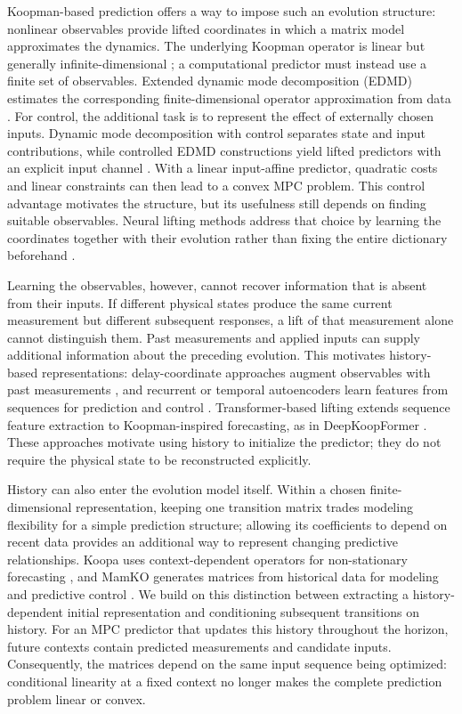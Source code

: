 \documentclass[journal]{IEEEtran}
\begin{document}
Koopman-based prediction offers a way to impose such an evolution structure: nonlinear observables provide lifted coordinates in which a matrix model approximates the dynamics. The underlying Koopman operator is linear but generally infinite-dimensional \cite{koopman1931hamiltonian,mezic2005spectral,brunton2022modern}; a computational predictor must instead use a finite set of observables. Extended dynamic mode decomposition (EDMD) estimates the corresponding finite-dimensional operator approximation from data \cite{williams2015data}. For control, the additional task is to represent the effect of externally chosen inputs. Dynamic mode decomposition with control separates state and input contributions, while controlled EDMD constructions yield lifted predictors with an explicit input channel \cite{proctor2016dmdc,korda2018linear}. With a linear input-affine predictor, quadratic costs and linear constraints can then lead to a convex MPC problem. This control advantage motivates the structure, but its usefulness still depends on finding suitable observables. Neural lifting methods address that choice by learning the coordinates together with their evolution rather than fixing the entire dictionary beforehand \cite{takeishi2017koopman,lusch2018deep,otto2019linearly,han2020deep}.

Learning the observables, however, cannot recover information that is absent from their inputs. If different physical states produce the same current measurement but different subsequent responses, a lift of that measurement alone cannot distinguish them. Past measurements and applied inputs can supply additional information about the preceding evolution. This motivates history-based representations: delay-coordinate approaches augment observables with past measurements \cite{kamb2020timedelay,das2019delay}, and recurrent or temporal autoencoders learn features from sequences for prediction and control \cite{han2024robust,shenoy2025temporal}. Transformer-based lifting extends sequence feature extraction to Koopman-inspired forecasting, as in DeepKoopFormer \cite{forootani2026deepkoopformer}. These approaches motivate using history to initialize the predictor; they do not require the physical state to be reconstructed explicitly.

History can also enter the evolution model itself. Within a chosen finite-dimensional representation, keeping one transition matrix trades modeling flexibility for a simple prediction structure; allowing its coefficients to depend on recent data provides an additional way to represent changing predictive relationships. Koopa uses context-dependent operators for non-stationary forecasting \cite{liu2023koopa}, and MamKO generates matrices from historical data for modeling and predictive control \cite{li2025mamko}. We build on this distinction between extracting a history-dependent initial representation and conditioning subsequent transitions on history. For an MPC predictor that updates this history throughout the horizon, future contexts contain predicted measurements and candidate inputs. Consequently, the matrices depend on the same input sequence being optimized: conditional linearity at a fixed context no longer makes the complete prediction problem linear or convex.
\end{document}
